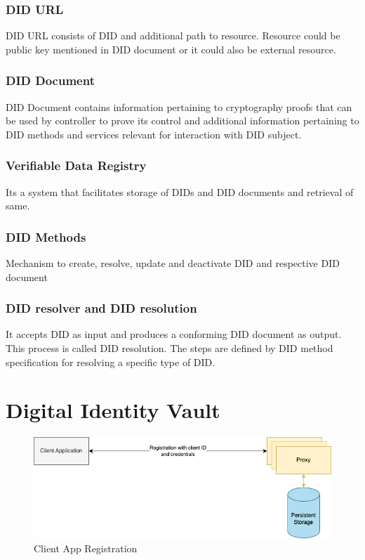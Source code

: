 \subsubsection{DID URL}
DID URL consists of DID and additional path to resource. Resource could be public key mentioned in DID document or it could also be external resource.
\subsubsection{DID Document}
DID Document contains information pertaining to cryptography proofs that can be used by controller to prove its control and additional information pertaining to DID methods and services relevant for interaction with DID subject.
\subsubsection{Verifiable Data Registry}
Its a system that facilitates storage of DIDs and DID documents and retrieval of same.
\subsubsection{DID Methods}
Mechanism to create, resolve, update and deactivate DID and respective DID document 
\subsubsection{DID resolver and DID resolution}
It accepts DID as input and produces a conforming DID document as output. This process is called DID resolution. The steps are defined by DID method specification for resolving a specific type of DID. 










    
\section*{Digital Identity Vault}


\begin{figure}
        
        \includegraphics[width=15cm]{images/Client App Registration.drawio.png}
        \centering
        \caption{Client App Registration}
        \label{fig:my_label}
    \end{figure}


